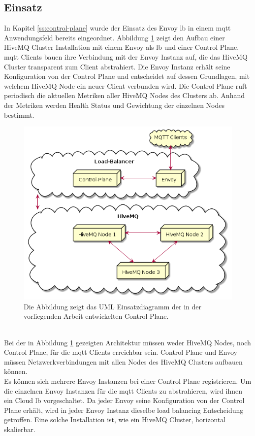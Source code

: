 \subsection{Einsatz}
In Kapitel \ref{ss:control-plane} wurde der Einsatz des Envoy \acl{lb} in einem \ac{mqtt} Anwendungsfeld bereits eingeordnet. Abbildung \ref{fig:deployment-diagram} zeigt den Aufbau einer HiveMQ Cluster Installation mit einem Envoy als \ac{lb} und einer Control Plane.
\\
\ac{mqtt} Clients bauen ihre Verbindung mit der Envoy Instanz auf, die das HiveMQ Cluster transparent zum Client abstrahiert. Die Envoy Instanz erhält seine Konfiguration von der Control Plane und entscheidet auf dessen Grundlagen, mit welchem HiveMQ Node ein neuer Client verbunden wird. Die Control Plane ruft periodisch die aktuellen Metriken aller HiveMQ Nodes des Clusters ab. Anhand der Metriken werden Health Status und Gewichtung der einzelnen Nodes bestimmt.
\begin{figure}
    \centering
    \includegraphics[scale=0.6]{gen/deployment.png}
    \caption{Die Abbildung zeigt das UML Einsatzdiagramm der in der vorliegenden Arbeit entwickelten Control Plane.}
    \label{fig:deployment-diagram}
\end{figure}
\\
Bei der in Abbildung \ref{fig:deployment-diagram} gezeigten Architektur müssen weder HiveMQ Nodes, noch Control Plane, für die \ac{mqtt} Clients erreichbar sein. Control Plane und Envoy müssen Netzwerkverbindungen mit allen Nodes des HiveMQ Clusters aufbauen können.
\\
Es können sich mehrere Envoy Instanzen bei einer Control Plane registrieren.
Um die einzelnen Envoy Instanzen für die \ac{mqtt} Clients zu abstrahieren, wird ihnen ein Cloud \acl{lb} vorgeschaltet.
Da jeder Envoy seine Konfiguration von der Control Plane erhält, wird in jeder Envoy Instanz dieselbe load balancing Entscheidung getroffen.
Eine solche Installation ist, wie ein HiveMQ Cluster, horizontal skalierbar.
\newpage
